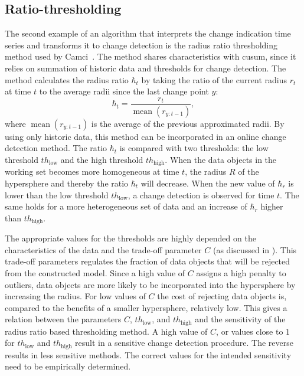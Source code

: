 \subsection{Ratio-thresholding}\label{subsec:ratio_thresholding}
The second example of an algorithm that interprets the change indication time series and transforms it to change detection is the radius ratio thresholding method used by Camci~\cite{camci2010change}.
The method shares characteristics with \gls{cusum}, since it relies on summation of historic data and thresholds for change detection.
The method calculates the radius ratio $\hbar_t$ by taking the ratio of the current radius $r_t$ at time $t$ to the average radii since the last change point $y$:
\begin{equation}\label{eq:ratio_radius}
  \hbar_t = \frac{r_t}{\operatorname*{mean}(r_{y:t-1})},
\end{equation}
where $\operatorname*{mean}(r_{y:t-1})$ is the average of the previous approximated radii.
By using only historic data, this method can be incorporated in an online change detection method.
The ratio $\hbar_t$ is compared with two thresholds: the low threshold $th_\text{low}$ and the high threshold $th_\text{high}$.
When the data objects in the working set becomes more homogeneous at time $t$, the radius $R$ of the hypersphere and thereby the ratio $\hbar_t$ will decrease.
When the new value of $\hbar_r$ is lower than the low threshold $th_\text{low}$, a change detection is observed for time $t$.
The same holds for a more heterogeneous set of data and an increase of $\hbar_r$ higher than $th_\text{high}$.

The appropriate values for the thresholds are highly depended on the characteristics of the data and the trade-off parameter $C$ (as discussed in ).
This trade-off parameters regulates the fraction of data objects that will be rejected from the constructed model.
Since a high value of $C$ assigns a high penalty to outliers, data objects are more likely to be incorporated into the hypersphere by increasing the radius.
For low values of $C$ the cost of rejecting data objects is, compared to the benefits of a smaller hypersphere, relatively low.
This gives a relation between the parameters $C$, $th_\text{low}$, and $th_\text{high}$ and the sensitivity of the radius ratio based thresholding method.
A high value of $C$, or values close to $1$ for $th_\text{low}$ and $th_\text{high}$ result in a sensitive change detection procedure.
The reverse results in less sensitive methods.
The correct values for the intended sensitivity need to be empirically determined.

